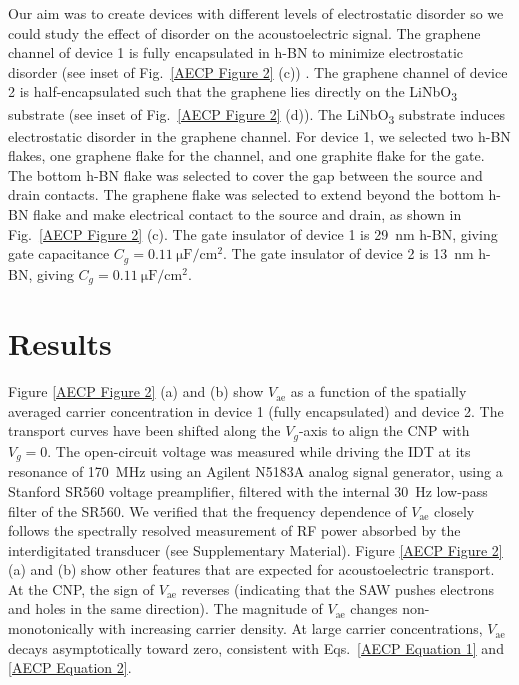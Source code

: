 \documentclass[double,12pt,1in,seploa]{beavtex}
\let\Oldsection\section
\renewcommand{\section}{\FloatBarrier\Oldsection}
\begin{document}
Our aim was to create devices with different levels of electrostatic disorder so we could study the effect of disorder on the acoustoelectric signal. The graphene channel of device 1 is fully encapsulated in h-BN to minimize electrostatic disorder (see inset of Fig.\ \ref{AECP Figure 2} (c)) \cite{dean_boron_2010}. The graphene channel of device 2 is half-encapsulated such that the graphene lies directly on the LiNbO\textsubscript{3} substrate (see inset of Fig.\ \ref{AECP Figure 2} (d)). The LiNbO\textsubscript{3} substrate induces electrostatic disorder in the graphene channel. For device 1, we selected two h-BN flakes, one graphene flake for the channel, and one graphite flake for the gate. The bottom h-BN flake was selected to cover the gap between the source and drain contacts. The graphene flake was selected to extend beyond the bottom h-BN flake and make electrical contact to the source and drain, as shown in Fig.\ \ref{AECP Figure 2} (c). The gate insulator of device 1 is \SI{29}{\nano\meter} h-BN, giving gate capacitance $C_g = \SI{0.11}{\micro\farad/\centi\meter^2}$. The gate insulator of device 2 is \SI{13}{\nano\meter} h-BN, giving $C_g = \SI{0.11}{\micro\farad/\centi\meter^2}$. 

\section{Results} \label{AE charge pumping results}

Figure \ref{AECP Figure 2} (a) and (b) show $V_{\mathrm{ae}}$ as a function of the spatially averaged carrier concentration in device 1 (fully encapsulated) and device 2. The transport curves have been shifted along the $V_g$-axis to align the CNP with $V_g=0$. The open-circuit voltage was measured while driving the IDT at its resonance of \SI{170}{\mega\hertz} using an Agilent N5183A analog signal generator, using a Stanford SR560 voltage preamplifier, filtered with the internal \SI{30}{\hertz} low-pass filter of the SR560. We verified that the frequency dependence of $V_{\mathrm{ae}}$ closely follows the spectrally resolved measurement of RF power absorbed by the interdigitated transducer (see Supplementary Material). Figure \ref{AECP Figure 2} (a) and (b) show other features that are expected for acoustoelectric transport. At the CNP, the sign of $V_{\mathrm{ae}}$ reverses (indicating that the SAW pushes electrons and holes in the same direction). The magnitude of $V_{\mathrm{ae}}$ changes non-monotonically with increasing carrier density. At large carrier concentrations, $V_{\mathrm{ae}}$ decays asymptotically toward zero, consistent with Eqs.\ \ref{AECP Equation 1} and \ref{AECP Equation 2}. 
\end{document}
